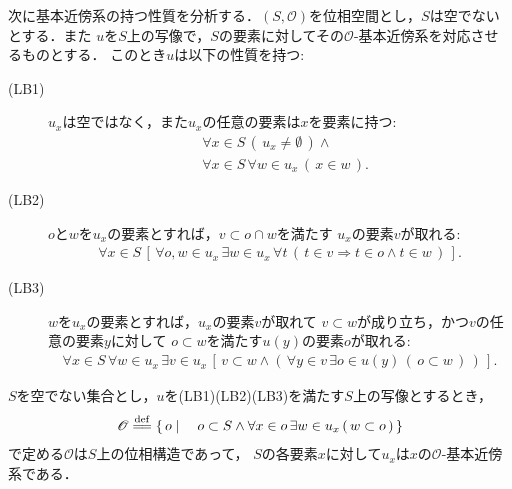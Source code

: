 	次に基本近傍系の持つ性質を分析する．$(S,\mathscr{O})$を位相空間とし，$S$は空でないとする．また
	$u$を$S$上の写像で，$S$の要素に対してその$\mathscr{O}$-基本近傍系を対応させるものとする．
	このとき$u$は以下の性質を持つ:
	\begin{description}
		\item[(LB1)] $u_{x}$は空ではなく，また$u_{x}$の任意の要素は$x$を要素に持つ:
			\begin{align}
				&\forall x \in S\, (\, u_{x} \neq \emptyset\, ) \wedge\\
				&\forall x \in S\, \forall w \in u_{x}\, (\, x \in w\, ).
			\end{align}

		\item[(LB2)] $o$と$w$を$u_{x}$の要素とすれば，$v \subset o \cap w$を満たす
			$u_{x}$の要素$v$が取れる:
			\begin{align}
				\forall x \in S\, 
				\left[\, \forall o,w \in u_{x}\, \exists w \in u_{x}\,
				\forall t\, \left(\, t \in v \Longrightarrow t \in o \wedge t \in w\, \right)\, \right].
			\end{align}
			
		\item[(LB3)] $w$を$u_{x}$の要素とすれば，$u_{x}$の要素$v$が取れて
			$v \subset w$が成り立ち，かつ$v$の任意の要素$y$に対して
			$o \subset w$を満たす$u(y)$の要素$o$が取れる:
			\begin{align}
				\forall x \in S\, \forall w \in u_{x}\, \exists v \in u_{x}\,
				\left[\, v \subset w \wedge \left(\, \forall y \in v\,
				\exists o \in u(y)\, (\, o \subset w\, )\, \right)\, \right].
			\end{align}
	\end{description}
	
	\begin{screen}
		\begin{thm}[与えられた集合を基本近傍系とする位相の生成]
		\label{thm:a_local_base_restores_the_topology}
			$S$を空でない集合とし，$u$を(LB1)(LB2)(LB3)を満たす$S$上の写像とするとき，
			\begin{align}
				\mathscr{O} \defeq
				\Set{o}{o \subset S \wedge \forall x \in o\, \exists w \in u_{x}\, (\, w \subset o\, )}
			\end{align}
			で定める$\mathscr{O}$は$S$上の位相構造であって，
			$S$の各要素$x$に対して$u_{x}$は$x$の$\mathscr{O}$-基本近傍系である．
		\end{thm}
	\end{screen}
	
